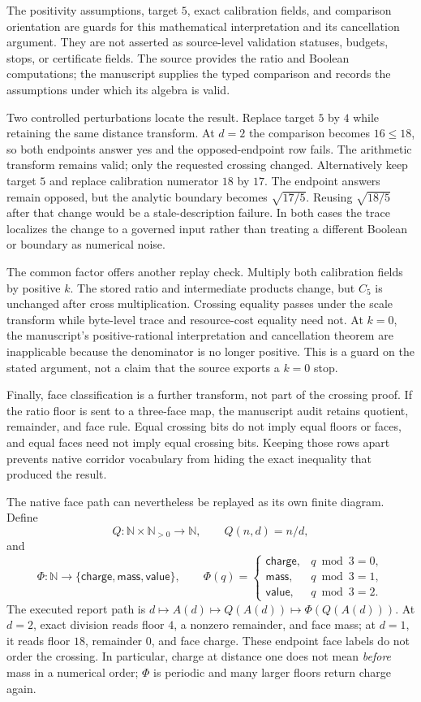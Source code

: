 The positivity assumptions, target \(5\), exact calibration fields, and comparison orientation are guards for this
mathematical interpretation and its cancellation argument.  They are not asserted as source-level validation
statuses, budgets, stops, or certificate fields.  The source provides the ratio and Boolean computations; the
manuscript supplies the typed comparison and records the assumptions under which its algebra is valid.

Two controlled perturbations locate the result.  Replace target \(5\) by \(4\) while retaining the same distance
transform.  At \(d=2\) the comparison becomes \(16\leq18\), so both endpoints answer yes and the opposed-endpoint row
fails.  The arithmetic transform remains valid; only the requested crossing changed.  Alternatively keep target
\(5\) and replace calibration numerator \(18\) by \(17\).  The endpoint answers remain opposed, but the analytic
boundary becomes \(\sqrt{17/5}\).  Reusing \(\sqrt{18/5}\) after that change would be a stale-description failure.
In both cases the trace localizes the change to a governed input rather than treating a different Boolean or boundary
as numerical noise.

The common factor offers another replay check.  Multiply both calibration fields by positive \(k\).  The stored ratio
and intermediate products change, but \(C_5\) is unchanged after cross multiplication.  Crossing equality passes
under the scale transform while byte-level trace and resource-cost equality need not.  At \(k=0\), the manuscript's
positive-rational interpretation and cancellation theorem are inapplicable because the denominator is no longer
positive.  This is a guard on the stated argument, not a claim that the source exports a \(k=0\) stop.

Finally, face classification is a further transform, not part of the crossing proof.  If the ratio floor is sent to
a three-face map, the manuscript audit retains quotient, remainder, and face rule.  Equal crossing bits do not imply equal
floors or faces, and equal faces need not imply equal crossing bits.  Keeping those rows apart prevents native
corridor vocabulary from hiding the exact inequality that produced the result.

The native face path can nevertheless be replayed as its own finite diagram.  Define
\[
 Q:\mathbb N\times\mathbb N_{>0}\to\mathbb N,\qquad Q(n,d)=n/d,
\]
and
\[
 \Phi:\mathbb N\to
 \{\mathsf{charge},\mathsf{mass},\mathsf{value}\},\qquad
 \Phi(q)=
 \begin{cases}
 \mathsf{charge},&q\bmod3=0,\\
 \mathsf{mass},&q\bmod3=1,\\
 \mathsf{value},&q\bmod3=2.
 \end{cases}
\]
The executed report path is \(d\mapsto A(d)\mapsto Q(A(d))\mapsto\Phi(Q(A(d)))\).  At \(d=2\), exact division reads
floor \(4\), a nonzero remainder, and face mass; at \(d=1\), it reads floor \(18\), remainder \(0\), and face charge.
These endpoint face labels do not order the crossing.  In particular, charge at distance one does not mean
\emph{before} mass in a numerical order; \(\Phi\) is periodic and many larger floors return charge again.

